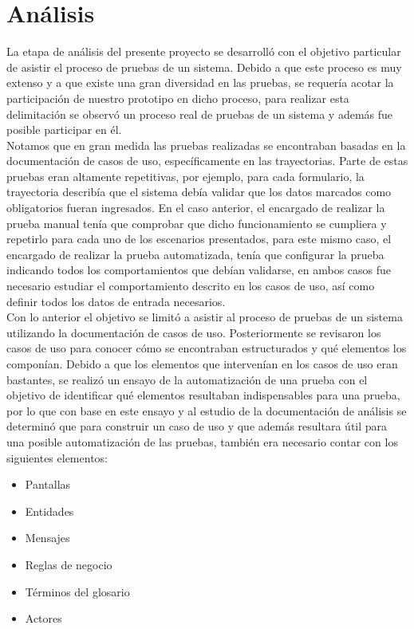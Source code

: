 \section{Análisis}



La etapa de análisis del presente proyecto se desarrolló con el objetivo particular de asistir el proceso de pruebas de un sistema. Debido a que este proceso es muy extenso y a que existe una gran diversidad en las pruebas, se requería acotar la participación de nuestro prototipo en dicho proceso, para realizar esta delimitación se observó un proceso real de pruebas de un sistema y además fue posible participar en él.\\


Notamos que en gran medida las pruebas realizadas se encontraban basadas en la documentación de casos de uso, específicamente en las trayectorias. Parte de estas pruebas eran altamente repetitivas, por ejemplo, para cada formulario, la trayectoria describía que el sistema debía validar que los datos marcados como obligatorios fueran ingresados. En el caso anterior, el encargado de realizar la prueba manual tenía que comprobar que dicho funcionamiento se cumpliera y repetirlo para cada uno de los escenarios presentados, para este mismo caso, el encargado de realizar la prueba automatizada, tenía que configurar la prueba indicando todos los comportamientos que debían validarse, en ambos casos fue necesario estudiar el comportamiento descrito en los casos de uso, así como definir todos los datos de entrada necesarios.\\


Con lo anterior el objetivo se limitó a asistir al proceso de pruebas de un sistema utilizando la documentación de casos de uso. Posteriormente se revisaron los casos de uso para conocer cómo se encontraban estructurados y qué elementos los componían. Debido a que los elementos que intervenían en los casos de uso eran bastantes, se realizó un ensayo de la automatización de una prueba con el objetivo de identificar qué elementos resultaban indispensables para una prueba, por lo que con base en este ensayo y al estudio de la documentación de análisis se determinó que para construir un caso de uso y que además resultara útil para una posible automatización de las pruebas, también era necesario contar con los siguientes elementos:

	\begin{itemize}
		\item Pantallas
		\item Entidades
		\item Mensajes
		\item Reglas de negocio
		\item Términos del glosario
		\item Actores
	\end{itemize}
	
